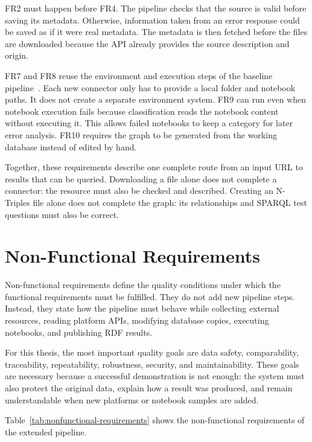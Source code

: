FR2 must happen before FR4. The pipeline checks that the source is valid before saving its metadata. Otherwise, information taken from an error response could be saved as if it were real metadata. The metadata is then fetched before the files are downloaded because the API already provides the source description and origin.

FR7 and FR8 reuse the environment and execution steps of the baseline pipeline~\cite{samuel2024computational}. Each new connector only has to provide a local folder and notebook paths. It does not create a separate environment system. FR9 can run even when notebook execution fails because classification reads the notebook content without executing it. This allows failed notebooks to keep a category for later error analysis. FR10 requires the graph to be generated from the working database instead of edited by hand.

Together, these requirements describe one complete route from an input URL to results that can be queried. Downloading a file alone does not complete a connector: the resource must also be checked and described. Creating an N-Triples file alone does not complete the graph: its relationships and SPARQL test questions must also be correct.

\clearpage
\section{Non-Functional Requirements}

Non-functional requirements define the quality conditions under which the functional requirements must be fulfilled. They do not add new pipeline steps. Instead, they state how the pipeline must behave while collecting external resources, reading platform APIs, modifying database copies, executing notebooks, and publishing RDF results.

For this thesis, the most important quality goals are data safety, comparability, traceability, repeatability, robustness, security, and maintainability. These goals are necessary because a successful demonstration is not enough: the system must also protect the original data, explain how a result was produced, and remain understandable when new platforms or notebook samples are added.

Table~\ref{tab:nonfunctional-requirements} shows the non-functional requirements of the extended pipeline.

